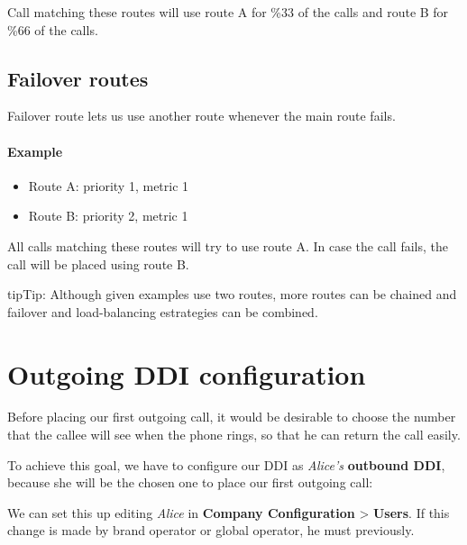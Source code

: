 \documentclass[letterpaper,10pt,english]{sphinxmanual}
\begin{document}
Call matching these routes will use route A for \%33 of the calls and route B for
\%66 of the calls.


\subsection{Failover routes}
\label{external_outgoing_calls/call_routing:failover-routes}
Failover route lets us use another route whenever the main route fails.
\paragraph{Example}
\begin{itemize}
\item {} 
Route A: priority 1, metric 1

\item {} 
Route B: priority 2, metric 1

\end{itemize}

All calls matching these routes will try to use route A. In case the call fails,
the call will be placed using route B.

\begin{notice}{tip}{Tip:}
Although given examples use two routes, more routes can be chained and
failover and load-balancing estrategies can be combined.
\end{notice}


\section{Outgoing DDI configuration}
\label{external_outgoing_calls/external_ddi:external-ddi}\label{external_outgoing_calls/external_ddi::doc}\label{external_outgoing_calls/external_ddi:outgoing-ddi-configuration}
Before placing our first outgoing call, it would be desirable to choose the
number that the callee will see when the phone rings, so that he can return the
call easily.

To achieve this goal, we have to configure our DDI as \emph{Alice's} \textbf{outbound DDI},
because she will be the chosen one to place our first outgoing call:

\noindent{}

We can set this up editing \emph{Alice} in \textbf{Company Configuration} \textgreater{} \textbf{Users}. If
this change is made by brand operator or global operator, he must {\hyperref[internal_calls/brand_portal:emulate\string-company]{}} previously.
\end{document}
